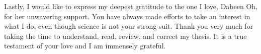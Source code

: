 \begin{otherlanguage}{english}

Lastly, I would like to express my deepest gratitude to the one I love, Dabeen Oh, for her unwavering support. You have always made efforts to take an interest in what I do, even though science is not your strong suit. Thank you very much for taking the time to understand, read, review, and correct my thesis. It is a true testament of your love and I am immensely grateful.

\endgroup

\clearpage
\mbox{}
\thispagestyle{empty}
\clearpage

%
%
%
%
%
%
%

\end{otherlanguage}
    